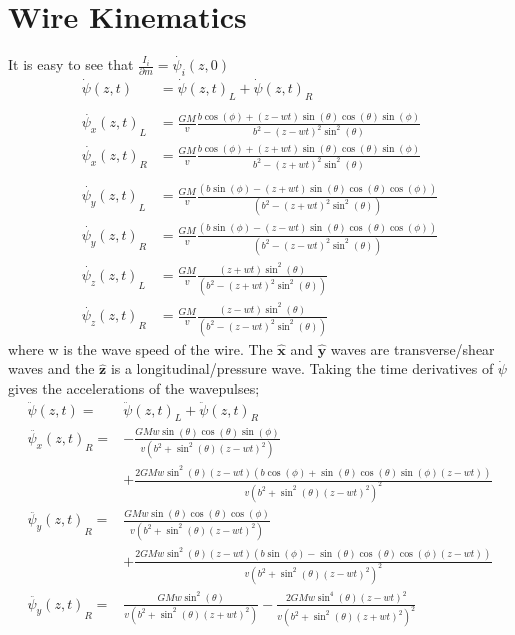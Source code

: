 \documentclass{report}
\begin{document}
\section*{Wire Kinematics}
It is easy to see that  $\frac{I_i}{\partial m} = \dot{\psi_i} (z, 0)$
\begin{align}
    \dot{\psi} (z, t) &= {\dot{\psi} (z, t)}_L + {\dot{\psi} (z, t)}_R\\
    \nonumber\\
    \nonumber {\dot{\psi_x} (z, t)}_L &= \frac{G M}{v} \frac{b \cos (\phi )+ (z - w t) \sin (\theta ) \cos (\theta ) \sin (\phi )}{b^2-{(z - w t)}^2 \sin ^2(\theta )}\\
    \nonumber {\dot{\psi_x} (z, t)}_R &= \frac{G M}{v} \frac{b \cos (\phi )+ (z + w t) \sin (\theta ) \cos (\theta ) \sin (\phi )}{b^2-{(z + w t)}^2 \sin ^2(\theta )}\\
    \nonumber\\
    \nonumber {\dot{\psi_y} (z, t)}_L &= \frac{G M}{v} \frac{(b \sin (\phi )-{(z + w t)} \sin (\theta ) \cos (\theta ) \cos (\phi ))}{\left(b^2-{(z + w t)}^2 \sin ^2(\theta )\right)}\\
    \nonumber {\dot{\psi_y} (z, t)}_R &= \frac{G M}{v} \frac{(b \sin (\phi )-{(z - w t)} \sin (\theta ) \cos (\theta ) \cos (\phi ))}{\left(b^2-{(z - w t)}^2 \sin ^2(\theta )\right)}
    \nonumber\\
    \nonumber {\dot{\psi_z} (z, t)}_L &= \frac{G M}{v} \frac{{(z + w t)} \sin ^2(\theta )}{\left(b^2-{(z + w t)}^2 \sin ^2(\theta )\right)}\\
    \nonumber {\dot{\psi_z} (z, t)}_R &= \frac{G M}{v} \frac{{(z - w t)} \sin ^2(\theta )}{\left(b^2-{(z - w t)}^2 \sin ^2(\theta )\right)}
\end{align}
where w is the wave speed of the wire. The $\mathbf{\hat x}$ and $\mathbf{\hat y}$ waves are transverse/shear waves and the $\mathbf{\hat z}$ is a longitudinal/pressure wave.
Taking the time derivatives of $\dot{\psi}$ gives the accelerations of the wavepulses;
\begin{align}
    \ddot{\psi} (z, t) =& {\ddot{\psi} (z, t)}_L + {\ddot{\psi} (z, t)}_R\\
    \nonumber {\ddot{\psi_x} (z, t)}_R =& -\frac{G M w \sin (\theta ) \cos (\theta ) \sin (\phi )}{v \left(b^2+\sin ^2(\theta ) {(z - w t)}^2\right) }\\
    & +\frac{2 G M w \sin ^2(\theta ) (z - w t) (b \cos (\phi )+\sin (\theta ) \cos (\theta ) \sin (\phi ) (z - w t))}{v {\left(b^2+\sin ^2(\theta ) {(z - w t)}^2\right)}^2}\\
    \nonumber {\ddot{\psi_y} (z, t)}_R =& \frac{G M w \sin (\theta ) \cos (\theta ) \cos (\phi )}{v \left(b^2+\sin ^2(\theta ) {(z - w t)}^2\right)}\\
    & +\frac{2 G M w \sin ^2(\theta ) (z - w t) (b \sin (\phi )-\sin (\theta ) \cos (\theta ) \cos (\phi ) (z - w t))}{v {\left(b^2+\sin ^2(\theta ) {(z - w t)}^2\right)}^2} \\
    \nonumber {\ddot{\psi_y} (z, t)}_R =& \frac{G M w \sin ^2(\theta )}{v \left(b^2+\sin ^2(\theta ) {(z + w t)}^2\right)} - \frac{2 G M w \sin ^4(\theta ) {(z - w t)}^2}{v {\left(b^2+\sin ^2(\theta ) {(z + w t)}^2\right)}^2}\\
\end{align} 
\end{document}
